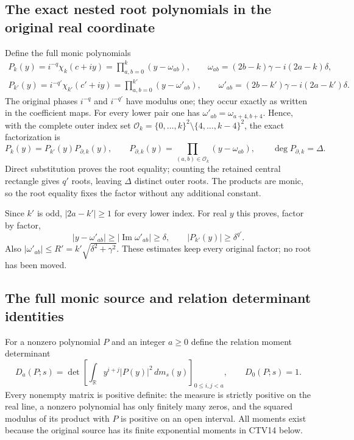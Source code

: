 \documentclass[11pt,a4paper]{article}
\begin{document}
\subsection{The exact nested root polynomials in the original real coordinate}

Define the full monic polynomials
\[
 \begin{gathered}
 P_k(y)=i^{-q}\chi_k(c+iy)
       =\prod_{a,b=0}^k(y-\omega_{ab}),\qquad
 \omega_{ab}=(2b-k)\gamma-i(2a-k)\delta,\\
 P_{k'}(y)=i^{-q'}\chi_{k'}(c'+iy)
       =\prod_{a,b=0}^{k'}(y-\omega'_{ab}),\qquad
 \omega'_{ab}=(2b-k')\gamma-i(2a-k')\delta .
 \end{gathered}\tag{CTV3}
\]
The original phases $i^{-q}$ and $i^{-q'}$ have modulus one;
they occur exactly as written in the coefficient maps.
For every lower pair one has
$\omega'_{ab}=\omega_{a+4,b+4}$. Hence, with the complete
outer index set
$\mathcal O_k=\{0,\ldots,k\}^2\setminus\{4,\ldots,k-4\}^2$,
the exact factorization is
\[
 P_k(y)=P_{k'}(y)P_{\partial,k}(y),\qquad
 P_{\partial,k}(y)=\prod_{(a,b)\in\mathcal O_k}(y-\omega_{ab}),
 \qquad \deg P_{\partial,k}=\Delta .
 \tag{CTV4}
\]
Direct substitution proves the root equality; counting the retained
central rectangle gives $q'$ roots, leaving $\Delta$ distinct
outer roots. The products are monic, so the root equality fixes
the factor without any additional constant.

Since $k'$ is odd, $|2a-k'|\ge1$ for every lower index.
For real $y$ this proves, factor by factor,
\[
 |y-\omega'_{ab}|\ge|\operatorname{Im}\omega'_{ab}|
        \ge\delta,\qquad
 |P_{k'}(y)|\ge\delta^{q'}.
 \tag{CTV5}
\]
Also $|\omega'_{ab}|\le
R'=k'\sqrt{\delta^2+\gamma^2}$. These estimates keep every
original factor; no root has been moved.

\subsection{The full monic source and relation determinant identities}

For a nonzero polynomial $P$ and an integer $a\ge0$ define the relation
moment determinant
\[
 D_a(P;s)=
 \det\left[\int_{\mathbb R}y^{i+j}|P(y)|^2\,dm_s(y)
                                    \right]_{0\le i,j<a},
 \qquad D_0(P;s)=1 .
 \tag{CTV6}
\]
Every nonempty matrix is positive definite: the measure is strictly
positive on the real line, a nonzero polynomial has only finitely
many zeros, and the squared modulus of its product with $P$
is positive on an open interval. All moments exist because the
original source has its finite exponential moments in CTV14 below.
\end{document}
